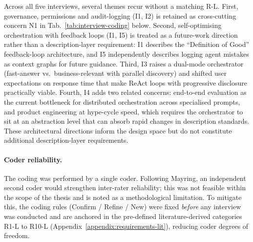 Across all five interviews, several themes recur without a matching R-L. First, governance, permissions and audit-logging (I1, I2) is retained as cross-cutting concern N1 in Tab.~\ref{tab:interview-coding} below. Second, self-optimising orchestration with feedback loops (I1, I5) is treated as a future-work direction rather than a description-layer requirement: I1 describes the ``Definition of Good'' feedback-loop architecture, and I5 independently describes logging agent mistakes as context graphs for future guidance. Third, I3 raises a dual-mode orchestrator (fast-answer vs.\ business-relevant with parallel discovery) and shifted user expectations on response time that make ReAct loops with progressive disclosure practically viable. Fourth, I4 adds two related concerns: end-to-end evaluation as the current bottleneck for distributed orchestration across specialised prompts, and product engineering at hype-cycle speed, which requires the orchestrator to sit at an abstraction level that can absorb rapid changes in description standards. These architectural directions inform the design space but do not constitute additional description-layer requirements.

\paragraph{Coder reliability.} The coding was performed by a single coder. Following Mayring, an independent second coder would strengthen inter-rater reliability; this was not feasible within the scope of the thesis and is noted as a methodological limitation. To mitigate this, the coding rules (Confirm / Refine / New) were fixed \emph{before} any interview was conducted and are anchored in the pre-defined literature-derived categories R1-L to R10-L (Appendix~\ref{appendix:requirements-lit}), reducing coder degrees of freedom.

